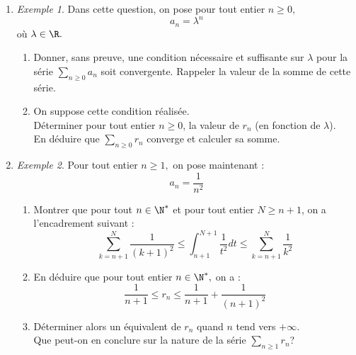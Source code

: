 \documentclass[twoside,french,11pt]{VcCours}
\begin{document}
  
  \begin{enumerate}
  
  \item {\it Exemple 1}. Dans cette question, on pose pour tout entier $n\geq 0,$ 
  $$a_n=\lambda^n$$
  où $\lambda\in\R.$
  
  \begin{enumerate}
    \item Donner, sans preuve, une condition nécessaire et suffisante sur $\lambda$ pour la série $\sum_{n \geq 0} a_n$ soit convergente. Rappeler la valeur de la somme de cette série. 
    
    \item On suppose cette condition réalisée. \\
    Déterminer pour tout entier $n \geq 0$, la valeur de $r_n$ (en fonction de $\lambda$). \\
    En déduire que $\sum_{n \geq 0} r_n$ converge et calculer sa somme.
  \end{enumerate}
  
  
  \item {\it Exemple 2}. Pour tout entier $n\geq 1,$ on pose maintenant :
  $$a_n=\frac{1}{n^2}$$
  
  \begin{enumerate}
  
  
  
  
  \item Montrer que pour tout $n\in\N^*$ et pour tout entier $N\geq n+1$, on a l'encadrement suivant :
  $$\sum_{k=n+1}^{N}\frac{1}{(k+1)^2}\leq
  \int_{n+1}^{N+1}\frac{1}{t^2}dt\leq
  \sum_{k=n+1}^{N}\frac{1}{k^2}$$
  
  
  
  \item En déduire que pour tout entier $n\in\N^*,$ on a :
  $$ \frac{1}{n+1}\leq r_n \leq
  \frac{1}{n+1}+\frac{1}{(n+1)^2}$$
  
  
  
  \item Déterminer alors un équivalent de $r_n$ quand $n$ tend vers $+\infty.$\\
  Que peut-on en conclure sur la nature de la série $\sum_{n \geq 1}
  r_n$?
  
  
  \end{enumerate}


\end{enumerate}
\end{document}
